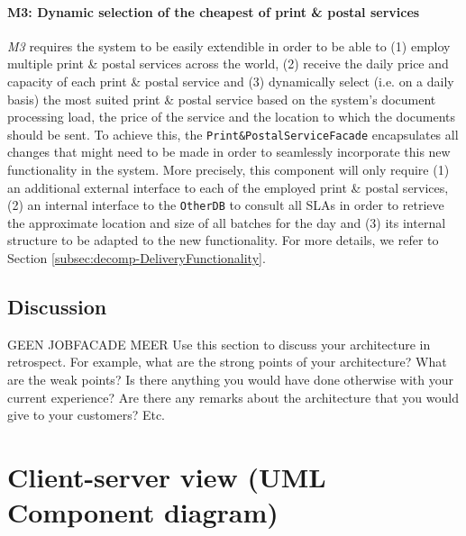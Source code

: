 \documentclass[a4paper,10pt]{article}
\begin{document}
\paragraph{M3: Dynamic selection of the cheapest of print \& postal services}
\textit{M3} requires the system to be easily extendible in order to be able to (1) employ multiple print \& postal services across the world, (2) receive the daily price and capacity of each print \& postal service and (3) dynamically select (i.e. on a daily basis) the most suited print \& postal service based on the system's document processing load, the price of the service and the location to which the documents should be sent. To achieve this, the \texttt{Print\&PostalServiceFacade} encapsulates all changes that might need to be made in order to seamlessly incorporate this new functionality in the system. More precisely, this component will only require (1) an additional external interface to each of the employed print \& postal services, (2) an internal interface to the \texttt{OtherDB} to consult all SLAs in order to retrieve the approximate location and size of all batches for the day and (3) its internal structure to be adapted to the new functionality.
For more details, we refer to Section \ref{subsec:decomp-DeliveryFunctionality}.

\subsection{Discussion}
GEEN JOBFACADE MEER
Use this section to discuss your architecture in retrospect.
For example, what are the strong points of your architecture?
What are the weak points? Is there anything you would have done otherwise with
your current experience?
Are there any remarks about the architecture that you would give to your
customers?
Etc.

\section{Client-server view (UML Component diagram)}\label{sec:client-server}
\end{document}
